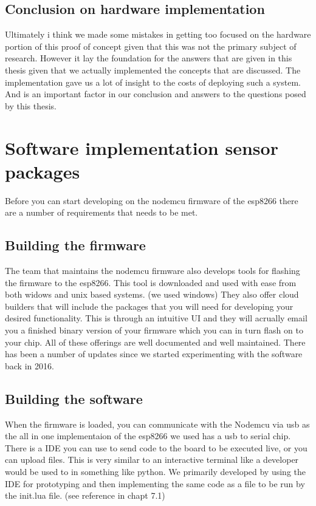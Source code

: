 \documentclass[]{uiophd}
\begin{document}
\subsection{Conclusion on hardware implementation}
Ultimately i think we made some mistakes in getting too focused on the hardware portion of this proof of concept given that this was not the primary subject of research. However it lay the foundation for the answers that are given in this thesis given that we actually implemented the concepts that are discussed. The implementation gave us a lot of insight to the costs of deploying such a system. And is an important factor in our conclusion and answers to the questions posed by this thesis.
\section{Software implementation sensor packages}
Before you can start developing on the nodemcu firmware of the esp8266 there are a number of requirements that needs to be met.
\subsection{Building the firmware}
The team that maintains the nodemcu firmware also develops tools for flashing the firmware to the esp8266. This tool is downloaded and used with ease from both widows and unix based systems. (we used windows) They also offer cloud builders that will include the packages that you will need for developing your desired functionality. This is through an intuitive UI and they will acrually email you a finished binary version of your firmware which you can in turn flash on to your chip. All of these offerings are well documented and well maintained. There has been a number of updates since we started experimenting with the software back in 2016.
\subsection{Building the software}
When the firmware is loaded, you can communicate with the Nodemcu via usb as the all in one implementaion of the esp8266 we used has a usb to serial chip. There is a IDE you can use to send code to the board to be executed live, or you can upload files. This is very similar to an interactive terminal like a developer would be used to in something like python. We primarily developed by using the IDE for prototyping and then implementing the same code as a file to be run by the init.lua file. (see reference in chapt 7.1)
\end{document}
